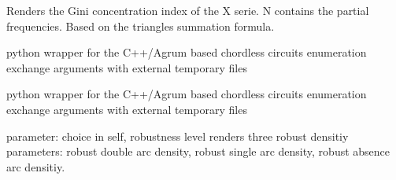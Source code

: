 \documentclass[letterpaper,10pt,english]{sphinxmanual}
\begin{document}
\begin{fulllineitems}
\begin{fulllineitems}
\end{fulllineitems}


\begin{fulllineitems}
\label{techDoc:digraphs.Digraph.computeConcentrationIndexTrapez}
Renders the Gini concentration index of the X serie.
N contains the partial frequencies.
Based on the triangles summation formula.

\end{fulllineitems}


\begin{fulllineitems}
\label{techDoc:digraphs.Digraph.computeCppChordlessCircuits}
python wrapper for the C++/Agrum based chordless circuits enumeration
exchange arguments with external temporary files

\end{fulllineitems}


\begin{fulllineitems}
\label{techDoc:digraphs.Digraph.computeCppInOutPipingChordlessCircuits}
python wrapper for the C++/Agrum based chordless circuits enumeration
exchange arguments with external temporary files

\end{fulllineitems}


\begin{fulllineitems}
\label{techDoc:digraphs.Digraph.computeCutLevelDensities}
parameter: choice in self, robustness level
renders three robust densitiy parameters:
robust double arc density,
robust single arc density,
robust absence arc densitiy.

\end{fulllineitems}



\end{fulllineitems}
\end{document}
